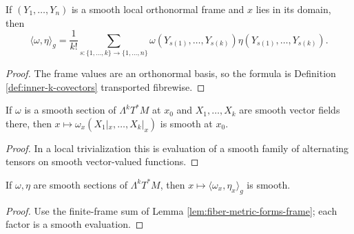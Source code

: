 \begin{lemma}
\label{lem:fiber-metric-forms-frame}
\leanok
{}
If $(Y_1,\ldots,Y_n)$ is a smooth local orthonormal frame and $x$ lies in its domain, then
\[
\langle\omega,\eta\rangle_g=\frac1{k!}\sum_{s:\{1,\ldots,k\}\to\{1,\ldots,n\}}\omega(Y_{s(1)},\ldots,Y_{s(k)})\eta(Y_{s(1)},\ldots,Y_{s(k)}).
\]
\end{lemma}
\begin{proof}
\leanok
{}
\sketch The frame values are an orthonormal basis, so the formula is Definition \ref{def:inner-k-covectors} transported fibrewise.
\end{proof}

\begin{lemma}
\label{lem:form-field-applied-to-vector-fields-smooth}
\leanok
If $\omega$ is a smooth section of $\Lambda^kT^*M$ at $x_0$ and $X_1,\ldots,X_k$ are smooth vector fields there, then $x\mapsto\omega_x(X_1|_x,\ldots,X_k|_x)$ is smooth at $x_0$.
\end{lemma}
\begin{proof}
\leanok
\sketch In a local trivialization this is evaluation of a smooth family of alternating tensors on smooth vector-valued functions.
\end{proof}

\begin{lemma}
\label{lem:fiber-metric-forms-smooth}
\leanok
{}
If $\omega,\eta$ are smooth sections of $\Lambda^kT^*M$, then $x\mapsto\langle\omega_x,\eta_x\rangle_g$ is smooth.
\end{lemma}
\begin{proof}
\leanok
{}
\sketch Use the finite-frame sum of Lemma \ref{lem:fiber-metric-forms-frame}; each factor is a smooth evaluation.
\end{proof}

